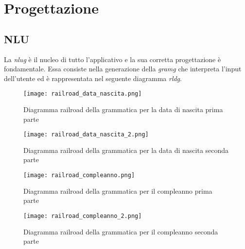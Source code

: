 \section{Progettazione}
	\subsection{NLU}
	La \emph{\gls{nlug}} è il nucleo di tutto l'applicativo e la sua corretta progettazione è fondamentale. Essa consiste nella generazione della \emph{\gls{gramg}} che interpreta l'input dell'utente ed è rappresentata nel seguente diagramma \emph{\gls{rldg}}.
	
		\begin{figure}[htbp]
			\begin{center}
				\texttt{[image: railroad\_data\_nascita.png]}
				\caption{Diagramma railroad della grammatica per la data di nascita prima parte}
			\end{center}
		\end{figure}
	
	
	\begin{figure}[htbp]
		\begin{center}
			\texttt{[image: railroad\_data\_nascita\_2.png]}
			\caption{Diagramma railroad della grammatica per la data di nascita seconda parte}
		\end{center}
	\end{figure}

	
	\begin{figure}[htbp]
		\begin{center}
			\texttt{[image: railroad\_compleanno.png]}
			\caption{Diagramma railroad della grammatica per il compleanno prima parte}
		\end{center}
	\end{figure}
	
	
	\begin{figure}[htbp]
		\begin{center}
			\texttt{[image: railroad\_compleanno\_2.png]}
			\caption{Diagramma railroad della grammatica per il compleanno seconda parte}
		\end{center}
	\end{figure}
	
